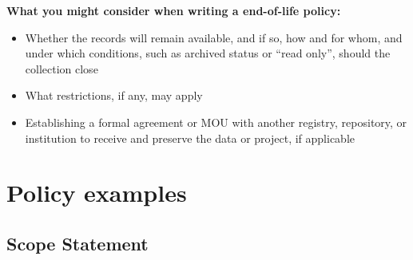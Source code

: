 \documentclass[11pt]{article}
\begin{document}
\textbf{What you might consider when writing a end-of-life policy:}

\begin{itemize}
\item Whether the records will remain available, and if so, how and for whom, and under which conditions, such as archived status or ``read only'', should the collection close

\item What restrictions, if any, may apply

\item Establishing a formal agreement or MOU with another registry, repository, or institution to receive and preserve the data or project, if applicable

\end{itemize}


\section{Policy examples}
\label{policy-examples}

\vspace*{-3pt}
\subsection{Scope Statement}
\label{scope-statement}
\end{document}
